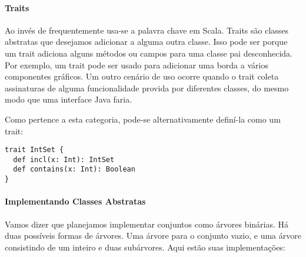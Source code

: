  \paragraph{Traits}

Ao inv\'{e}s de  frequentemente usa-se a palavra chave
 em Scala. Traits s\~{a}o classes abstratas que desejamos adicionar
a alguma outra classe. Isso pode ser porque um trait adiciona alguns m\'{e}todos
ou campos para uma classe pai desconhecida. Por exemplo, um trait  
pode ser usado para adicionar uma borda a v\'{a}rios componentes gr\'{a}ficos. Um outro
cen\'{a}rio de uso ocorre quando o trait coleta assinaturas de alguma funcionalidade 
provida por diferentes classes, do mesmo modo que uma interface Java faria.

Como  pertence a esta categoria, pode-se alternativamente 
defin\'{i}-la como um trait:
\begin{lstlisting}
trait IntSet {
  def incl(x: Int): IntSet
  def contains(x: Int): Boolean
}
\end{lstlisting}

\paragraph{Implementando Classes Abstratas}

Vamos dizer que planejamos implementar conjuntos como \'{a}rvores bin\'{a}rias. H\'{a} 
duas poss\'{i}veis formas de \'{a}rvores. Uma \'{a}rvore para o conjunto vazio, e uma 
\'{a}rvore consistindo de um inteiro e duas sub\'{a}rvores. Aqui est\~{a}o suas implementa\c{c}\~{o}es:
 

